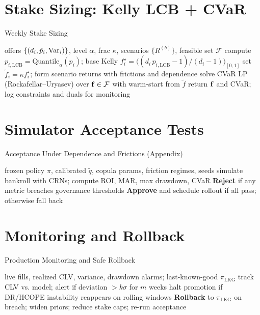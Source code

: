 \section{Stake Sizing: Kelly LCB + CVaR}
\begin{algorithm}[H]
  \caption{Weekly Stake Sizing}
  \label{alg:stake-sizing}
  \begin{algorithmic}[1]
    \Require offers $\{(d_i, \hat p_i, \mathrm{Var}_i)\}$, level $\alpha$, frac $\kappa$, scenarios $\{R^{(b)}\}$, feasible set $\mathcal F$
    \State compute $p_{i,\text{LCB}} = \text{Quantile}_{\alpha}(p_i)$; base Kelly $f_i^\star = \big((d_i\,p_{i,\text{LCB}}-1)/(d_i-1)\big)_{[0,1]}$
    \State set $\tilde f_i = \kappa f_i^\star$; form scenario returns with frictions and dependence
    \State solve CVaR LP (Rockafellar–Uryasev) over $\mathbf{f}\in\mathcal F$ with warm-start from $\tilde f$
    \State return $\mathbf{f}$ and CVaR; log constraints and duals for monitoring
  \end{algorithmic}
\end{algorithm}

\section{Simulator Acceptance Tests}
\begin{algorithm}[H]
  \caption{Acceptance Under Dependence and Frictions (Appendix)}
  \label{alg:sim-accept-appendix}
  \begin{algorithmic}[1]
    \Require frozen policy $\pi$, calibrated $\tilde q$, copula params, friction regimes, seeds
      \State simulate bankroll with CRNs; compute ROI, MAR, max drawdown, CVaR
      \State \textbf{Reject} if any metric breaches governance thresholds
    \EndFor
    \State \textbf{Approve} and schedule rollout if all pass; otherwise fall back
  \end{algorithmic}
\end{algorithm}

\section{Monitoring and Rollback}
\begin{algorithm}[H]
  \caption{Production Monitoring and Safe Rollback}
  \label{alg:monitoring}
  \begin{algorithmic}[1]
    \Require live fills, realized CLV, variance, drawdown alarms; last-known-good $\pi_{\text{LKG}}$
    \State track CLV vs. model; alert if deviation $>k\sigma$ for $m$ weeks
    \State halt promotion if DR/HCOPE instability reappears on rolling windows
    \State \textbf{Rollback} to $\pi_{\text{LKG}}$ on breach; widen priors; reduce stake caps; re-run acceptance
  \end{algorithmic}
\end{algorithm}

